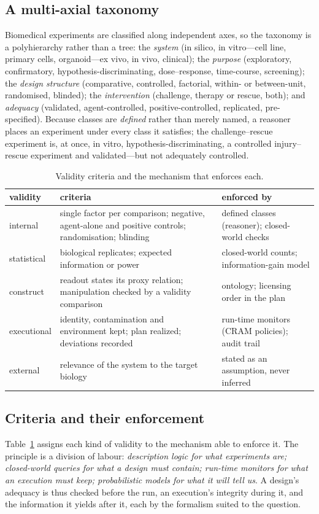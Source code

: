 \documentclass[10pt,a4paper]{article}
\begin{document}
\subsection{A multi-axial taxonomy}
Biomedical experiments are classified along independent axes, so the taxonomy is a polyhierarchy rather than a tree:
the \emph{system} (in silico, in vitro---cell line, primary cells, organoid---ex vivo, in vivo, clinical); the
\emph{purpose} (exploratory, confirmatory, hypothesis-discriminating, dose--response, time-course, screening); the
\emph{design structure} (comparative, controlled, factorial, within- or between-unit, randomised, blinded); the
\emph{intervention} (challenge, therapy or rescue, both); and \emph{adequacy} (validated, agent-controlled,
positive-controlled, replicated, pre-specified). Because classes are \emph{defined} rather than merely named, a
reasoner places an experiment under every class it satisfies; the challenge--rescue experiment is, at once, in vitro,
hypothesis-discriminating, a controlled injury--rescue experiment and validated---but not adequately controlled.

\begin{table}[tbp]\centering\small
\caption{Validity criteria and the mechanism that enforces each.}\label{tab:enforce}
\begin{tabularx}{\linewidth}{@{}p{1.9cm}Xp{4.6cm}@{}}\toprule validity & criteria & enforced by \\ \midrule
internal & single factor per comparison; negative, agent-alone and positive controls; randomisation; blinding & defined classes (reasoner); closed-world checks \\
statistical & biological replicates; expected information or power & closed-world counts; information-gain model \\
construct & readout states its proxy relation; manipulation checked by a validity comparison & ontology; licensing order in the plan \\
executional & identity, contamination and environment kept; plan realized; deviations recorded & run-time monitors (CRAM policies); audit trail \\
external & relevance of the system to the target biology & stated as an assumption, never inferred \\
\bottomrule\end{tabularx}\end{table}


\subsection{Criteria and their enforcement}
Table~\ref{tab:enforce} assigns each kind of validity to the mechanism able to enforce it. The principle is a division
of labour: \emph{description logic for what experiments are; closed-world queries for what a design must contain;
run-time monitors for what an execution must keep; probabilistic models for what it will tell us}. A design's
adequacy is thus checked before the run, an execution's integrity during it, and the information it yields after it,
each by the formalism suited to the question.
\end{document}
